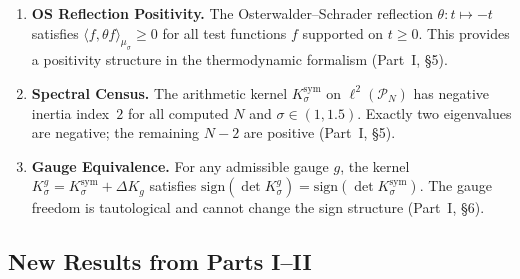 \documentclass[12pt,a4paper]{article}
\theoremstyle{definition}
\theoremstyle{remark}
\newcommand{\Ksym}{K_\sigma^{\mathrm{sym}}}
\newcommand{\muG}{\mu_\sigma}
\newcommand{\PP}{\mathcal{P}}
\begin{document}
\begin{enumerate}[label=\textbf{R\arabic*},leftmargin=3em]
  \item \textbf{OS Reflection Positivity.} The Osterwalder--Schrader reflection $\theta: t \mapsto -t$ satisfies $\langle f, \theta f \rangle_{\muG} \geq 0$ for all test functions $f$ supported on $t \geq 0$. This provides a positivity structure in the thermodynamic formalism (Part~I, \S5).

  \item \textbf{Spectral Census.} The arithmetic kernel $\Ksym$ on $\ell^2(\PP_N)$ has negative inertia index~$2$ for all computed $N$ and $\sigma \in (1, 1.5)$. Exactly two eigenvalues are negative; the remaining $N-2$ are positive (Part~I, \S5).

  \item \textbf{Gauge Equivalence.} For any admissible gauge $g$, the kernel $K_\sigma^g = \Ksym + \Delta K_g$ satisfies $\mathrm{sign}(\det K_\sigma^g) = \mathrm{sign}(\det \Ksym)$. The gauge freedom is tautological and cannot change the sign structure (Part~I, \S6).
\end{enumerate}


\subsection{New Results from Parts I--II}
\end{document}
